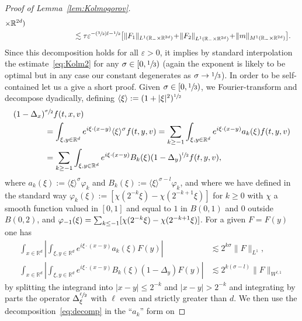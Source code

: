 \documentclass[10pt]{amsart}
\newcommand{\Psfrac}[2]{(\sfrac{#1}{#2})}
\theoremstyle{definition}
\theoremstyle{remark}
\newcommand\R{{\mathbb R}}
\let\var\varepsilon
\begin{document}
\begin{proof}[Proof of Lemma~\ref{lem:Kolmogorov}]
\begin{align*}
{\times \R^{2d})} \\
& \hphantom{\| f_\var \|_{L^1(\R_- \times \R^{2d})}} \lesssim
\tau \var^{-\Psfrac32 l -\sfrac12}
\bigl[ \| F_1 \|_{L^1(\R_- \times \R^{2d})} \!+\!
\left\| F_2 \right\|_{L^1(\R_- \times \R^{2d})}
\!+\! \| m \|_{M^1(\R_- \times \R^{2d})} \bigr].
\end{align*}
Since this decomposition holds for all $\var >0$, it implies by
standard interpolation the estimate~\eqref{eq:Kolm2} for any
$\sigma \in [0,\sfrac{1}{3})$ (again the exponent is likely to
be optimal but in any case our constant degenerates as
$\sigma \to \sfrac{1}{3}$). In order to be self-contained let us
a give a short proof. Given $\sigma \in [0,\sfrac13)$, we
Fourier-transform and decompose dyadically, defining
$\langle \xi \rangle:= (1+|\xi|^2)^{\sfrac12}$
\begin{equation}
\label{eq:decomp}
\begin{aligned}
(1-\Delta_x)&^{\sfrac{\sigma}{2}} f(t,x,v) \\
&= \int_{\xi,y \in \R^d} e^{i \xi
\cdot (x-y)} \langle \xi \rangle^\sigma
f(t,y,v)
= \sum_{k \ge -1} \int_{\xi,y \in \R^d} e^{i \xi
\cdot (x-y)} a_k(\xi) f(t,y,v) \\
&= \sum_{k \ge -1} \int_{\xi,y \in \R^d} e^{i \xi
\cdot (x-y)} B_k(\xi) (1-\Delta_y)^{\sfrac{l}{2}} f(t,y,v),
\end{aligned}
\end{equation}
where $a_k(\xi) := \langle \xi \rangle^\sigma \varphi_k$ and
$B_k(\xi) := \langle \xi \rangle^{\sigma-l} \varphi_k$, and
where we have defined in the standard way
$\varphi_k(\xi) := [ \chi(2^{-k}\xi) - \chi(2^{-k+1} \xi) ]$
for $k \ge 0$ with $\chi$ a smooth function valued in $[0,1]$
and equal to $1$ in $B(0,1)$ and $0$ outside $B(0,2)$, and
$\varphi_{-1}(\xi) =\nobreak \sum_{k \le -1} [ \chi(2^{-k}\xi) -\nobreak
\chi(2^{-k+1} \xi) ]$. For a given $F=F(y)$ one has
\begin{align*}
\int_{x \in \R^d} \left| \int_{\xi,y \in \R^d} e^{i \xi
\cdot (x-y)} a_k(\xi) F(y)
\right| &\lesssim 2^{k\sigma} \| F \|_{L^1}, \\
\int_{x \in \R^d} \left| \int_{\xi,y \in \R^d} e^{i \xi
\cdot (x-y)} B_k(\xi) (1-\Delta_y) F(y)
\right| &\lesssim 2^{k(\sigma-l)} \| F \|_{W^{l,1}}
\end{align*}
by splitting the integrand into $|x-y| \le 2^{-k}$ and
$|x-y| > 2^{-k}$ and integrating by parts the operator
$\Delta_\xi^{\sfrac{\ell}{2}}$ with $\ell$ even and strictly
greater than $d$. We then use the
decomposition~\eqref{eq:decomp} in the ``$a_k$'' form on

\end{proof}
\end{document}
